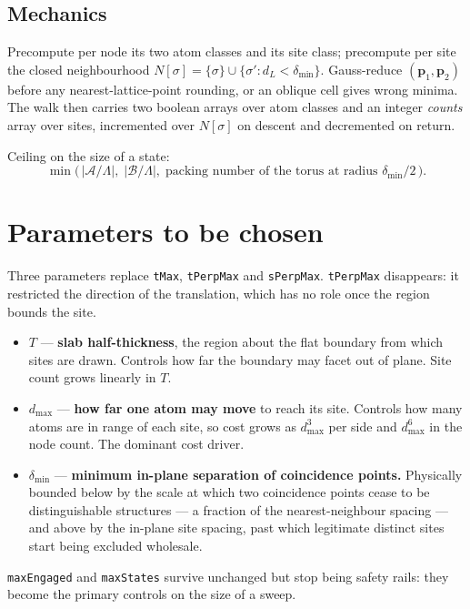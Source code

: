 \documentclass[11pt]{article}
\newcommand{\A}{\mathcal{A}}
\newcommand{\B}{\mathcal{B}}
\newcommand{\dmax}{d_{\max}}
\newcommand{\dmin}{\delta_{\min}}
\begin{document}
\subsection*{Mechanics}

Precompute per node its two atom classes and its site class; precompute per site
the closed neighbourhood $N[\sigma] = \{\sigma\} \cup \{\sigma' : d_L < \dmin\}$.
Gauss-reduce $(\mathbf{p}_1,\mathbf{p}_2)$ before any nearest-lattice-point
rounding, or an oblique cell gives wrong minima. The walk then carries two
boolean arrays over atom classes and an integer \emph{counts} array over sites,
incremented over $N[\sigma]$ on descent and decremented on return.

Ceiling on the size of a state:
\[
  \min\bigl(\,\lvert \A/\Lambda \rvert,\;
             \lvert \B/\Lambda \rvert,\;
             \text{packing number of the torus at radius } \dmin/2 \,\bigr).
\]

\section*{Parameters to be chosen}

Three parameters replace \texttt{tMax}, \texttt{tPerpMax} and
\texttt{sPerpMax}. \texttt{tPerpMax} disappears: it restricted the direction of
the translation, which has no role once the region bounds the site.

\begin{itemize}
  \item $T$ --- \textbf{slab half-thickness}, the region about the flat boundary
        from which sites are drawn. Controls how far the boundary may facet out
        of plane. Site count grows linearly in $T$.
  \item $\dmax$ --- \textbf{how far one atom may move} to reach its site.
        Controls how many atoms are in range of each site, so cost grows as
        $\dmax^3$ per side and $\dmax^6$ in the node count. The dominant cost
        driver.
  \item $\dmin$ --- \textbf{minimum in-plane separation of coincidence points.}
        Physically bounded below by the scale at which two coincidence points
        cease to be distinguishable structures --- a fraction of the
        nearest-neighbour spacing --- and above by the in-plane site spacing,
        past which legitimate distinct sites start being excluded wholesale.
\end{itemize}
\texttt{maxEngaged} and \texttt{maxStates} survive unchanged but stop being
safety rails: they become the primary controls on the size of a sweep.
\end{document}
